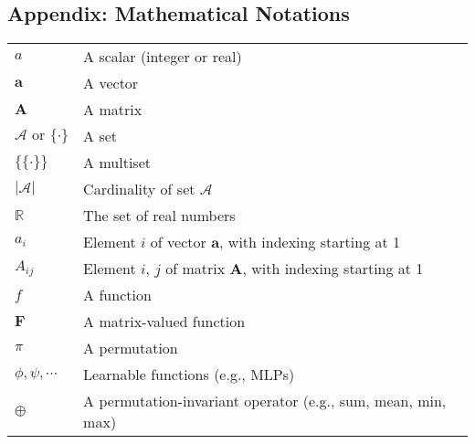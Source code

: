 \documentclass{article}
\begin{document}
\newpage

\subsection*{Appendix: Mathematical Notations}

\renewcommand\arraystretch{1.5}
\begin{tabular}{p{2cm}p{12cm}}
	$\displaystyle a$ & A scalar (integer or real) \\
	$\displaystyle \mathbf{a}$ & A vector \\
	$\displaystyle \mathbf{A}$ & A matrix \\
	$\displaystyle \mathcal{A}\text{ or }\{\cdot\}$ & A set \\
	$\displaystyle \{\!\{\cdot\}\!\}$ & A multiset \\
	$\displaystyle |\mathcal{A}|$ & Cardinality of set $\mathcal{A}$ \\
	$\displaystyle \mathbb{R}$ & The set of real numbers \\
	$\displaystyle a_i$ & Element $i$ of vector $\mathbf{a}$, with indexing starting at 1 \\
	$\displaystyle A_{ij}$ & Element $i$, $j$ of matrix $\mathbf{A}$, with indexing starting at 1 \\
	$\displaystyle f$ & A function \\
	$\displaystyle \bm{F}$ & A matrix-valued function \\
	$\displaystyle \pi$ & A permutation \\
	$\displaystyle \phi, \psi, \cdots$ & Learnable functions (e.g., MLPs) \\
	$\displaystyle \oplus$ & A permutation-invariant operator (e.g., sum, mean, min, max)
\end{tabular}
\end{document}
